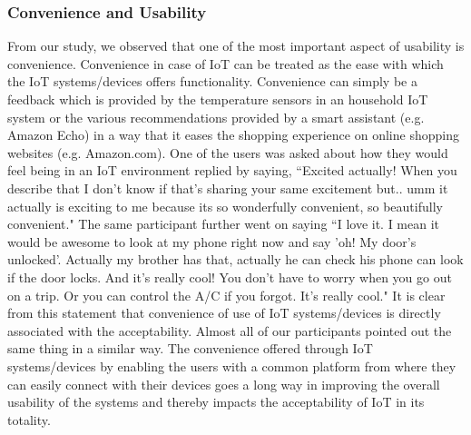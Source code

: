 \subsubsection{Convenience and Usability}
From our study, we observed that one of the most important aspect of usability is convenience. Convenience in case of IoT can be treated as the ease with which the IoT systems/devices offers functionality. Convenience can simply be a feedback which is provided by the temperature sensors in an household IoT system or the various recommendations provided by a smart assistant (e.g. Amazon Echo) in a way that it eases the shopping experience on online shopping websites (e.g. Amazon.com). One of the users was asked about how they would feel being in an IoT environment replied by saying, ``Excited actually! When you describe that I don't know if that's sharing your same excitement but.. umm it actually is exciting to me because its so wonderfully convenient, so beautifully convenient." The same participant further went on saying ``I love it. I mean it would be awesome to look at my phone right now and say 'oh! My door's unlocked'. Actually my brother has that, actually he can check his phone can look if the door locks. And it's really cool! You don't have to worry when you go out on a trip. Or you can control the A/C if you forgot. It's really cool."  It is clear from this statement that convenience of use of IoT systems/devices is directly associated with the acceptability. Almost all of our participants pointed out the same thing in a similar way. The convenience offered through IoT systems/devices by enabling the users with a common platform from where they can easily connect with their devices goes a long way in improving the overall usability of the systems and thereby impacts the acceptability of IoT in its totality. 

